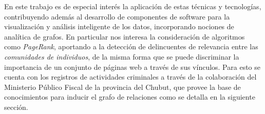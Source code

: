 En este trabajo es de especial interés la aplicación de estas técnicas y tecnologías, contribuyendo además al desarrollo de componentes de software para la visualización y análisis inteligente de los datos, incorporando nociones de analítica de grafos. 
En particular nos interesa la consideración de algoritmos como \textit{PageRank}, aportando a la detección de delincuentes de relevancia entre las \textit{comunidades de individuos}, de la misma forma que se puede discriminar la importancia de un conjunto de páginas web a través de sus vínculos. 
Para esto se cuenta con los registros de actividades criminales a través de la colaboración del Ministerio Público Fiscal de la provincia del Chubut, que provee la base de conocimientos para inducir el grafo de relaciones como se detalla en la siguiente sección.
